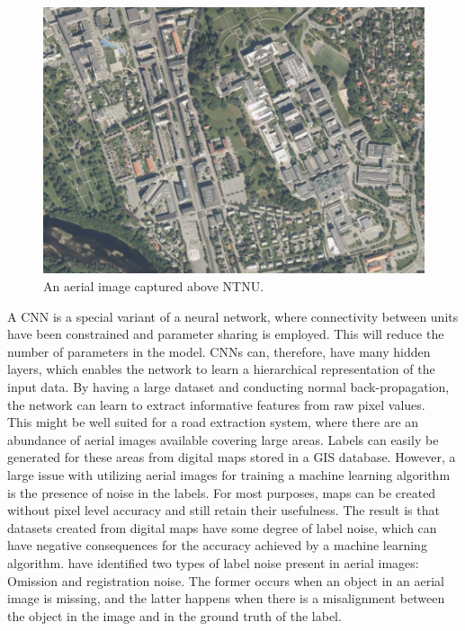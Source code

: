 \begin{figure}[t]
\begin{center}
\includegraphics[width=0.8\columnwidth]{figs/aerial_image.png}
\caption[Aerial image]{An aerial image captured above NTNU.}
\label{fig:aerialimage}
\end{center}
\end{figure}

A \ac{CNN} is a special variant of a neural network, where connectivity between units have been constrained and parameter sharing is employed. This will reduce the number of parameters in the model. \ac{CNN}s can, therefore, have many hidden layers, which enables the network to learn a hierarchical representation of the input data. By having a large dataset and conducting normal back-propagation, the network can learn to extract informative features from raw pixel values. \\

This might be well suited for a road extraction system, where there are an abundance of aerial images available covering large areas. Labels can easily be generated for these areas from digital maps stored in a \ac{GIS} database. However, a large issue with utilizing aerial images for training a machine learning algorithm is the presence of noise in the labels. For most purposes, maps can be created without pixel level accuracy and still retain their usefulness. The result is that datasets created from digital maps have some degree of label noise, which can have negative consequences for the accuracy achieved by a machine learning algorithm. \cite{Mnih_aerial_images_noisy} have identified two types of label noise present in aerial images: Omission and registration noise. The former occurs when an object in an aerial image is missing, and the latter happens when there is a misalignment between the object in the image and in the ground truth of the label.\\

